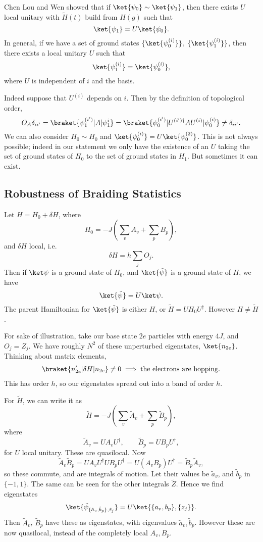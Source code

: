 \documentclass[12pt]{article}
\begin{document}
Chen Lou and Wen showed that if $\ket{\psi_0} \sim \ket{\psi_1}$, then there exists $U$ local unitary with $\tilde H(t)$ build from $H(g)$ such that
\[
	\ket{\psi_1} = U \ket{\psi_0}.
\]
In general, if we have a set of ground states $\{\ket{\psi_0^{(i)}}\}$, $\{\ket{\psi_1^{(i)}}\}$, then there exists a local unitary $U$ such that
\[
	\ket{\psi_1^{(i)}} = \ket{\psi_0^{(i)}},
\]
where $U$ is independent of $i$ and the basis.

Indeed suppose that $U^{(i)}$ depends on $i$. Then by the definition of topological order,
\[
	O_A \delta_{i i'} = \braket{\psi_1^{(i')}|A|\psi_1^{i}} = \braket{\psi_0^{(i')}|U^{(i')\dagger}A U^{(i)} | \psi_0^{(i)}} \neq \delta_{i i'}.
\]
We can also consider $H_0 \sim H_0$ and $\ket{\psi_0^{(i)}} = U \ket{\psi_0^{(2)}}$. This is not always possible; indeed in our statement we only have the existence of an $U$ taking the set of ground states of $H_0$ to the set of ground states in $H_1$. But sometimes it can exist.

\subsection{Robustness of Braiding Statistics}%
\label{sub:rbs}

Let $H = H_0 + \delta H$, where
\[
H_0 = - J \left( \sum_v A_v + \sum_p B_p \right),
\]
and $\delta H$ local, i.e.
\[
\delta H = h \sum_j O_j.
\]
Then if $\ket \psi$ is a ground state of $H_0$, and $\ket{\tilde \psi}$ is a ground state of $H$, we have
\[
	\ket{\tilde \psi} = U \ket \psi.
\]
The parent Hamiltonian for $\ket{\tilde \psi}$ is either $H$, or $\tilde H = U H_0 U^{\dagger}$. However $H \neq \tilde H$.

For sake of illustration, take our base state $2e$ particles with energy $4J$, and $O_j = Z_j$. We have roughly $N^2$ of these unperturbed eigenstates, $\ket{n_{2e}}$. Thinking about matrix elements,
\begin{align*}
	\braket{n_{2e}'|\delta H|n_{2e}} \neq 0 \implies \text{the electrons are hopping}.
\end{align*}
This has order $h$, so our eigenstates spread out into a band of order $h$.

For $\tilde H$, we can write it as
\[
\tilde H = - J \left( \sum_v \tilde A_v + \sum_p \tilde B_p \right),
\]
where
\[
\tilde A_v = U A_v U^{\dagger}, \qquad \tilde B_p = U B_p U^{\dagger},
\] 
for $U$ local unitary. These are quasilocal. Now
\[
\tilde A_v \tilde B_p = U A_v U^{\dagger} U B_p U^{\dagger} = U(A_v B_p) U^{\dagger} = \tilde B_p \tilde A_v,
\]
so these commute, and are integrals of motion. Let their values be $\tilde a_v$, and $\tilde b_p$ in $\{-1, 1\}$. The same can be seen for the other integrals $\tilde Z$. Hence we find eigenstates
\[
	\ket{\tilde \psi_{\{\tilde a_v, \tilde b_p\}, \tilde z_j} } = U \ket{\{a_v, b_p\}, \{z_j\}}.
\]
Then $\tilde A_v$, $\tilde B_p$ have these as eigenstates, with eigenvalues $\tilde a_v, \tilde b_p$. However these are now quasilocal, instead of the completely local $A_v, B_p$.
\end{document}
